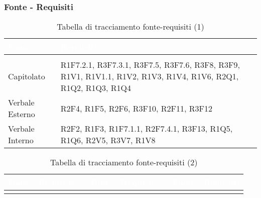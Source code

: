 \subsubsection{Fonte - Requisiti}
\renewcommand{\arraystretch}{1.5}
{
\setlength\arrayrulewidth{1pt}
\begin{longtable}{C{3cm} | C{9cm}}
		\textcolor{white}{\textbf{Fonte}} & 
		\textcolor{white}{\textbf{Requisiti}}\\
		\endfirsthead
	    \\
	    \endfoot
	    \caption{Tabella di tracciamento fonte-requisiti (1)}
	    \endlastfoot


Capitolato &  	R1F7.2.1, R3F7.3.1, R3F7.5, R3F7.6, R3F8, R3F9, R1V1, R1V1.1, R1V2, R1V3, R1V4, R1V6, R2Q1, R1Q2, R1Q3, R1Q4 \\

Verbale Esterno & R2F4, R1F5, R2F6, R3F10, R2F11, R3F12 \\

Verbale Interno & 	R2F2, R1F3, R1F7.1.1, R2F7.4.1, R3F13, R1Q5, R1Q6, R2V5, R3V7, R1V8 \\

\end{longtable}

\vspace{2cm}

\begin{longtable}{C{2cm} | C{2cm} C{0.5cm} C{2cm} | C{2cm} C{0.5cm} C{2cm} C{2cm}}
		\textcolor{white}{\textbf{Fonte}} & 
		\textcolor{white}{\textbf{Requisiti}} &
		 &
		\textcolor{white}{\textbf{Fonte}} & 
		\textcolor{white}{\textbf{Requisiti}} &
		 &
		\textcolor{white}{\textbf{Fonte}} & 
		\textcolor{white}{\textbf{Requisiti}} \\
		\endfirsthead
	    
	    \endfoot
	    \caption{Tabella di tracciamento fonte-requisiti (2)}
	    \endlastfoot



\end{longtable}}
